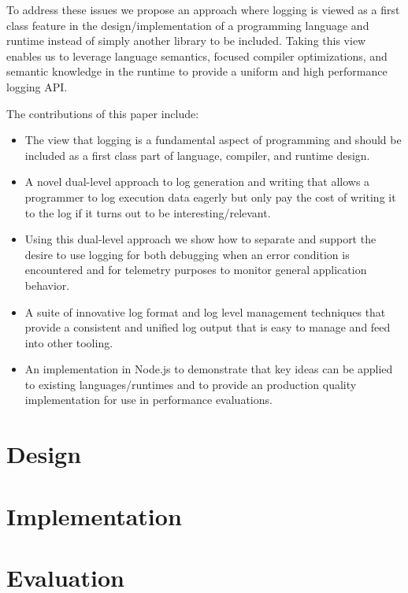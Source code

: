 \documentclass[sigplan,10pt]{acmart}
\begin{document}
To address these issues we propose an approach where logging is viewed as a first 
class feature in the design/implementation of a programming language and runtime 
instead of simply another library to be included. Taking this view enables us to 
leverage language semantics, focused compiler optimizations, and semantic knowledge 
in the runtime to provide a uniform and high performance logging API.

\noindent
The contributions of this paper include:
\begin{itemize}
\item The view that logging is a fundamental aspect of programming and should be
included as a first class part of language, compiler, and runtime design.

\item A novel dual-level approach to log generation and writing that allows a
programmer to log execution data eagerly but only pay the cost of writing it to
the log if it turns out to be interesting/relevant.

\item Using this dual-level approach we show how to separate and support the 
desire to use logging for both debugging when an error condition is encountered 
and for telemetry purposes to monitor general application behavior. 

\item A suite of innovative log format and log level management techniques that 
provide a consistent and unified log output that is easy to manage and feed into 
other tooling.

\item An implementation in Node.js to demonstrate that key ideas can be applied 
to existing languages/runtimes and to provide an production quality implementation 
for use in performance evaluations.
\end{itemize}

\section{Design}
\label{sec:design}


\section{Implementation}
\label{sec:implementation}


\section{Evaluation}
\label{sec:evaluation}

\end{document}
